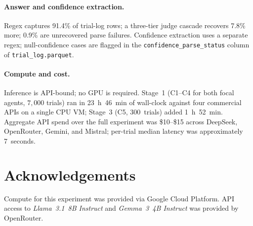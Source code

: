 \documentclass[review,3p,authoryear]{elsarticle}
\begin{document}
\paragraph{Answer and confidence extraction.}
Regex captures 91.4\% of trial-log rows; a three-tier judge cascade
recovers 7.8\% more; 0.9\% are unrecovered parse failures.
Confidence extraction uses a separate regex; null-confidence cases are
flagged in the \texttt{confidence\_parse\_status} column of
\texttt{trial\_log.parquet}.

\paragraph{Compute and cost.}
Inference is API-bound; no GPU is required.
Stage~1 (C1--C4 for both focal agents, $7{,}000$ trials) ran in
23~h~46~min of wall-clock against four commercial APIs on a single
CPU VM; Stage~3 (C5, 300~trials) added 1~h~52~min.
Aggregate API spend over the full experiment was \$10--\$15 across
DeepSeek, OpenRouter, Gemini, and Mistral; per-trial median latency
was approximately 7~seconds.

\section*{Acknowledgements}
Compute for this experiment was provided via Google Cloud Platform.
API access to \textit{Llama~3.1~8B Instruct} and \textit{Gemma~3~4B Instruct}
was provided by OpenRouter.


\end{document}
